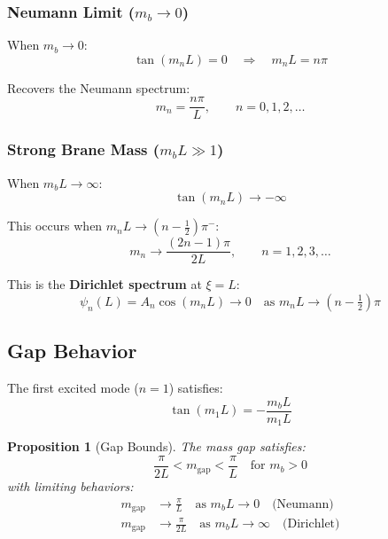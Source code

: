 \documentclass[11pt,a4paper]{article}
\newcommand{\mgap}{m_{\mathrm{gap}}}
\newcommand{\mb}{m_b}
\theoremstyle{definition}
\theoremstyle{plain}
\newtheorem{proposition}{Proposition}[section]
\theoremstyle{remark}
\begin{document}
\subsubsection{Neumann Limit ($\mb \to 0$)}

When $\mb \to 0$:
\begin{equation}
\tan(m_n L) = 0 \quad \Rightarrow \quad m_n L = n\pi
\label{eq:neumann-limit}
\end{equation}

Recovers the Neumann spectrum:
\begin{equation}
m_n = \frac{n\pi}{L}, \qquad n = 0, 1, 2, \ldots
\label{eq:neumann-recovered}
\end{equation}

\subsubsection{Strong Brane Mass ($\mb L \gg 1$)}

When $\mb L \to \infty$:
\begin{equation}
\tan(m_n L) \to -\infty
\label{eq:strong-limit}
\end{equation}

This occurs when $m_n L \to (n - \tfrac{1}{2})\pi^-$:
\begin{equation}
m_n \to \frac{(2n-1)\pi}{2L}, \qquad n = 1, 2, 3, \ldots
\label{eq:dirichlet-limit}
\end{equation}

This is the \textbf{Dirichlet spectrum} at $\xi = L$:
\begin{equation}
\psi_n(L) = A_n\cos(m_n L) \to 0 \quad \text{as } m_n L \to (n-\tfrac{1}{2})\pi
\label{eq:dirichlet-bc}
\end{equation}

\subsection{Gap Behavior}

The first excited mode ($n = 1$) satisfies:
\begin{equation}
\tan(m_1 L) = -\frac{\mb L}{m_1 L}
\label{eq:gap-eq}
\end{equation}

\begin{proposition}[Gap Bounds]
\label{prop:gap-bounds}
The mass gap satisfies:
\begin{equation}
\boxed{\frac{\pi}{2L} < \mgap < \frac{\pi}{L} \quad \text{for } \mb > 0}
\label{eq:gap-bounds}
\end{equation}
with limiting behaviors:
\begin{align}
\mgap &\to \frac{\pi}{L} \quad \text{as } \mb L \to 0 \quad \text{(Neumann)} \label{eq:gap-neumann-lim} \\
\mgap &\to \frac{\pi}{2L} \quad \text{as } \mb L \to \infty \quad \text{(Dirichlet)} \label{eq:gap-dirichlet-lim}
\end{align}
\end{proposition}
\end{document}
